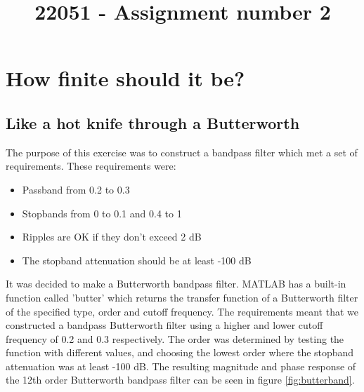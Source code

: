 \documentclass[journal]{IEEEtran}
\begin{document}
\title{22051 - Assignment number 2}
\author{\vspace{-10mm}}

\maketitle

\section{How finite should it be?}

\subsection{Like a hot knife through a Butterworth}
The purpose of this exercise was to construct a bandpass filter which met a set of requirements. These requirements were:
\begin{itemize}
\item Passband from 0.2 to 0.3
\item Stopbands from 0 to 0.1 and 0.4 to 1
\item Ripples are OK if they don't exceed 2 dB
\item The stopband attenuation should be at least -100 dB
\end{itemize}

It was decided to make a Butterworth bandpass filter. MATLAB has a built-in function called 'butter' which returns the transfer function of a Butterworth filter of the specified type, order and cutoff frequency. 
\newline
The requirements meant that we constructed a bandpass Butterworth filter using a higher and lower cutoff frequency of 0.2 and 0.3 respectively. The order was determined by testing the function with different values, and choosing the lowest order where the stopband attenuation was at least -100 dB. The resulting magnitude and phase response of the 12th order Butterworth bandpass filter can be seen in figure \ref{fig:butterband}.
\end{document}
